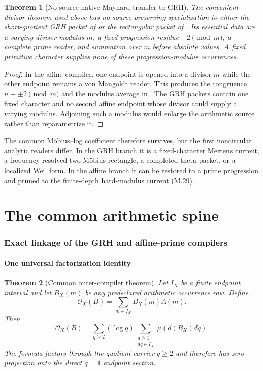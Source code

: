 \documentclass[11pt]{article}
\newtheorem{theorem}{Theorem}[section]
\theoremstyle{definition}
\theoremstyle{remark}
\begin{document}
\begin{theorem}[No source-native Maynard transfer to GRH]
\label{thm:hard-no-transfer-GRH}
The convenient-divisor theorem used above has no source-preserving
specialization to either the short-quotient GRH packet of
 or the rectangular packet of
.  Its essential data are a varying divisor modulus
$m$, a fixed progression residue $\pm2\pmod m$, a complete prime reader, and
summation over $m$ before absolute values.  A fixed primitive character
supplies none of these progression-modulus occurrences.
\end{theorem}

\begin{proof}
In the affine compiler, one endpoint is opened into a divisor $m$ while the
other endpoint remains a von Mangoldt reader.  This produces the congruence
$n\equiv\pm2\pmod m$ and the modulus average in
.  The GRH packets contain one fixed character
and no second affine endpoint whose divisor could supply a varying modulus.
Adjoining such a modulus would enlarge the arithmetic source rather than
reparametrize it.
\end{proof}

The common M\"obius--log coefficient therefore survives, but the first
noncircular analytic readers differ.  In the GRH branch it is a fixed-character
Mertens current, a frequency-resolved two-M\"obius rectangle, a completed
theta packet, or a localized Weil form.  In the affine branch it can be
restored to a prime progression and pruned to the finite-depth hard-modulus
current \textup{(M.29)}.

\part{The common arithmetic spine}

\section{Exact linkage of the GRH and affine-prime compilers}
\label{sec:common-spine}

\subsection{One universal factorization identity}

\begin{theorem}[Common outer-compiler theorem]
\label{thm:common-outer}
Let $I_X$ be a finite endpoint interval and let $B_X(m)$ be any predeclared
arithmetic occurrence row.  Define
\[
 \mathcal O_X(B)=\sum_{m\in I_X}B_X(m)\Lambda(m).
\]
Then
\[
 \mathcal O_X(B)
 =\sum_{q\ge2}(\log q)
   \sum_{\substack{d\ge1\\dq\in I_X}}\mu(d)B_X(dq).
\]
The formula factors through the quotient carrier $q\ge2$ and therefore has
zero projection onto the direct $q=1$ endpoint section.
\end{theorem}
\end{document}
